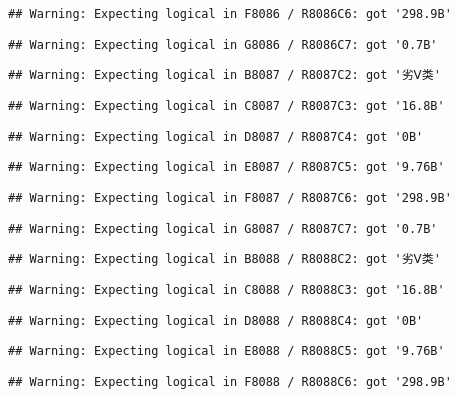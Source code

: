 \documentclass[
]{article}
\begin{document}
\begin{verbatim}
## Warning: Expecting logical in F8086 / R8086C6: got '298.9B'
\end{verbatim}

\begin{verbatim}
## Warning: Expecting logical in G8086 / R8086C7: got '0.7B'
\end{verbatim}

\begin{verbatim}
## Warning: Expecting logical in B8087 / R8087C2: got '劣Ⅴ类'
\end{verbatim}

\begin{verbatim}
## Warning: Expecting logical in C8087 / R8087C3: got '16.8B'
\end{verbatim}

\begin{verbatim}
## Warning: Expecting logical in D8087 / R8087C4: got '0B'
\end{verbatim}

\begin{verbatim}
## Warning: Expecting logical in E8087 / R8087C5: got '9.76B'
\end{verbatim}

\begin{verbatim}
## Warning: Expecting logical in F8087 / R8087C6: got '298.9B'
\end{verbatim}

\begin{verbatim}
## Warning: Expecting logical in G8087 / R8087C7: got '0.7B'
\end{verbatim}

\begin{verbatim}
## Warning: Expecting logical in B8088 / R8088C2: got '劣Ⅴ类'
\end{verbatim}

\begin{verbatim}
## Warning: Expecting logical in C8088 / R8088C3: got '16.8B'
\end{verbatim}

\begin{verbatim}
## Warning: Expecting logical in D8088 / R8088C4: got '0B'
\end{verbatim}

\begin{verbatim}
## Warning: Expecting logical in E8088 / R8088C5: got '9.76B'
\end{verbatim}

\begin{verbatim}
## Warning: Expecting logical in F8088 / R8088C6: got '298.9B'
\end{verbatim}
\end{document}
